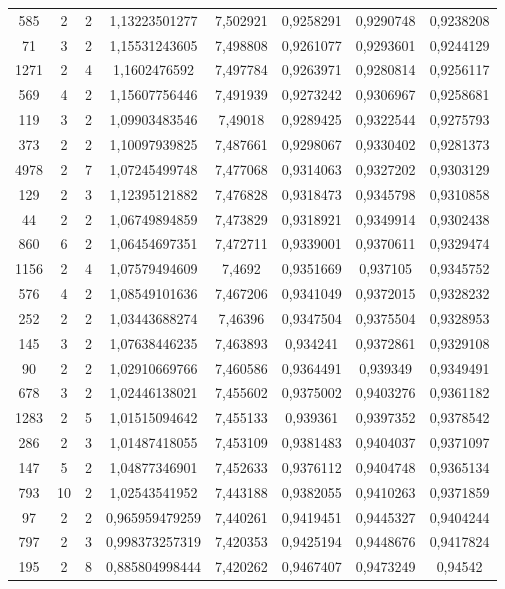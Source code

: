 \begin{longtable}{|c|c|c|c|c|c|c|c|}
585 & 2 & 2 & 1,13223501277 & 7,502921 & 0,9258291 & 0,9290748 & 0,9238208 \\
71 & 3 & 2 & 1,15531243605 & 7,498808 & 0,9261077 & 0,9293601 & 0,9244129 \\
1271 & 2 & 4 & 1,1602476592 & 7,497784 & 0,9263971 & 0,9280814 & 0,9256117 \\
569 & 4 & 2 & 1,15607756446 & 7,491939 & 0,9273242 & 0,9306967 & 0,9258681 \\
119 & 3 & 2 & 1,09903483546 & 7,49018 & 0,9289425 & 0,9322544 & 0,9275793 \\
373 & 2 & 2 & 1,10097939825 & 7,487661 & 0,9298067 & 0,9330402 & 0,9281373 \\
4978 & 2 & 7 & 1,07245499748 & 7,477068 & 0,9314063 & 0,9327202 & 0,9303129 \\
129 & 2 & 3 & 1,12395121882 & 7,476828 & 0,9318473 & 0,9345798 & 0,9310858 \\
44 & 2 & 2 & 1,06749894859 & 7,473829 & 0,9318921 & 0,9349914 & 0,9302438 \\
860 & 6 & 2 & 1,06454697351 & 7,472711 & 0,9339001 & 0,9370611 & 0,9329474 \\
1156 & 2 & 4 & 1,07579494609 & 7,4692 & 0,9351669 & 0,937105 & 0,9345752 \\
576 & 4 & 2 & 1,08549101636 & 7,467206 & 0,9341049 & 0,9372015 & 0,9328232 \\
252 & 2 & 2 & 1,03443688274 & 7,46396 & 0,9347504 & 0,9375504 & 0,9328953 \\
145 & 3 & 2 & 1,07638446235 & 7,463893 & 0,934241 & 0,9372861 & 0,9329108 \\
90 & 2 & 2 & 1,02910669766 & 7,460586 & 0,9364491 & 0,939349 & 0,9349491 \\
678 & 3 & 2 & 1,02446138021 & 7,455602 & 0,9375002 & 0,9403276 & 0,9361182 \\
1283 & 2 & 5 & 1,01515094642 & 7,455133 & 0,939361 & 0,9397352 & 0,9378542 \\
286 & 2 & 3 & 1,01487418055 & 7,453109 & 0,9381483 & 0,9404037 & 0,9371097 \\
147 & 5 & 2 & 1,04877346901 & 7,452633 & 0,9376112 & 0,9404748 & 0,9365134 \\
793 & 10 & 2 & 1,02543541952 & 7,443188 & 0,9382055 & 0,9410263 & 0,9371859 \\
97 & 2 & 2 & 0,965959479259 & 7,440261 & 0,9419451 & 0,9445327 & 0,9404244 \\
797 & 2 & 3 & 0,998373257319 & 7,420353 & 0,9425194 & 0,9448676 & 0,9417824 \\
195 & 2 & 8 & 0,885804998444 & 7,420262 & 0,9467407 & 0,9473249 & 0,94542 \\

\end{longtable}

